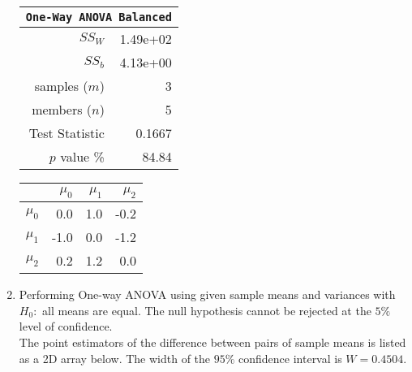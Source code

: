 \begin{enumerate}
	\begin{table}[H]
		\centering
		\begin{minipage}{0.4\textwidth}
			\centering
			\begin{tabular}{@{}rr@{}}
				\toprule
				\multicolumn{2}{c}{\texttt{One-Way ANOVA Balanced}} \\
				\midrule
				$SS_W$         &               1.49e+02 \\
				$SS_b$         &               4.13e+00 \\
				samples ($m$)  &                      3 \\
				members ($n$)  &                      5 \\
				Test Statistic &                 0.1667 \\
				$p$ value \%   &                  84.84 \\
				\bottomrule
			\end{tabular}
		\end{minipage}
		\begin{minipage}{0.4\textwidth}
			\centering
			\begin{tabular}{lrrr}
				\toprule
				{} &  $\mu_0$ &  $\mu_1$ &  $\mu_2$ \\
				\midrule
				$\mu_0$ &      0.0 &      1.0 &     -0.2 \\
				$\mu_1$ &     -1.0 &      0.0 &     -1.2 \\
				$\mu_2$ &      0.2 &      1.2 &      0.0 \\
				\bottomrule
			\end{tabular}
		\end{minipage}
	\end{table}

	\item Performing One-way ANOVA using given sample means and variances with $ H_0 : $ all means are equal. The null hypothesis cannot be rejected at the $ 5\% $ level of confidence. \\
	
	The point estimators of the difference between pairs of sample means is listed as a 2D array below. The width of the $ 95\% $ confidence interval is $ W = 0.4504 $.\\
	

\end{enumerate}
